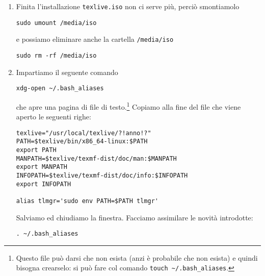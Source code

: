 \begin{enumerate}
\item Finita l'installazione \lstinline£texlive.iso£ non ci serve più, perciò smontiamolo
\begin{lstlisting}
sudo umount /media/iso
\end{lstlisting}
e possiamo eliminare anche la cartella \lstinline£/media/iso£
\begin{lstlisting}
sudo rm -rf /media/iso
\end{lstlisting}

\item Impartiamo il seguente comando
\begin{lstlisting}
xdg-open ~/.bash_aliases
\end{lstlisting}
che apre una pagina di file di testo.\footnote{Questo file può darsi che non esista (anzi è probabile che non esista) e quindi bisogna crearselo: si può fare col comando \lstinline£touch ~/.bash_aliases£.} Copiamo alla fine del file che viene aperto le seguenti righe:
\begin{lstlisting}
texlive="/usr/local/texlive/?!anno!?"
PATH=$texlive/bin/x86_64-linux:$PATH
export PATH
MANPATH=$texlive/texmf-dist/doc/man:$MANPATH
export MANPATH
INFOPATH=$texlive/texmf-dist/doc/info:$INFOPATH
export INFOPATH

alias tlmgr='sudo env PATH=$PATH tlmgr'
\end{lstlisting}
Salviamo ed chiudiamo la finestra. Facciamo assimilare le novità introdotte:
\begin{lstlisting}
. ~/.bash_aliases
\end{lstlisting}

\end{enumerate}
